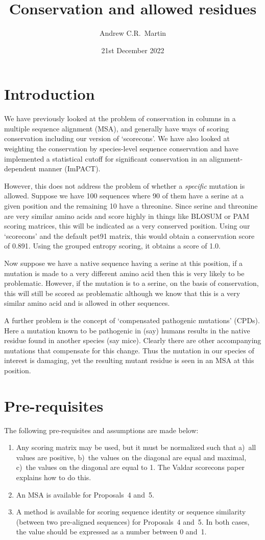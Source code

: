 \documentclass[a4paper]{article}
\title{Conservation and allowed residues}
\author{Andrew C.R.\ Martin}
\date{21st December 2022}
\begin{document}
\maketitle

\section{Introduction}
We have previously looked at the problem of conservation in columns in
a multiple sequence alignment (MSA), and generally have ways of
scoring conservation including our version of `scorecons'. We have
also looked at weighting the conservation by species-level sequence
conservation and have implemented a statistical cutoff for significant
conservation in an alignment-dependent manner (ImPACT).

However, this does not address the problem of whether a
\emph{specific} mutation is allowed. Suppose we have 100 sequences
where 90 of them have a serine at a given position and the remaining
10 have a threonine. Since serine and threonine are very similar amino
acids and score highly in things like BLOSUM or PAM scoring matrices,
this will be indicated as a very conserved position. Using our
`scorecons' and the default pet91 matrix, this would obtain a
conservation score of 0.891. Using the grouped entropy scoring, it
obtains a score of 1.0.

Now suppose we have a native sequence having a serine at this position,
if a mutation is made to a very different amino acid then this is very
likely to be problematic. However, if the mutation is to a serine, on
the basis of conservation, this will still be scored as problematic
although we know that this is a very similar amino acid and is allowed
in other sequences.

A further problem is the concept of `compensated pathogenic mutations'
(CPDs). Here a mutation known to be pathogenic in (say) humans results
in the native residue found in another species (say mice). Clearly
there are other accompanying mutations that compensate for this
change. Thus the mutation in our species of interest is damaging, yet
the resulting mutant residue is seen in an MSA at this position.

\section{Pre-requisites}
The following pre-requisites and assumptions are made below:

\begin{enumerate}
  \item Any scoring matrix may be used, but it must be normalized such
    that a)~all values are positive, b)~the values on the diagonal are
    equal and maximal, c)~the values on the diagonal are equal to
    1. The Valdar scorecons paper explains how to do this.
  \item An MSA is available for Proposals~4 and~5.
  \item A method is available for scoring sequence identity or
    sequence similarity (between two pre-aligned sequences) for
    Proposals~4 and~5. In both cases, the value should be expressed as
    a number between 0 and~1.
\end{enumerate}
\end{document}
